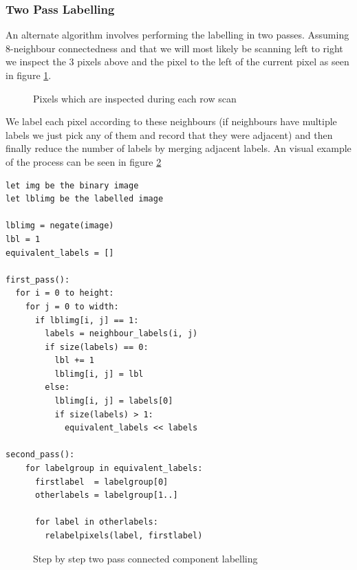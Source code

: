 \subsubsection{Two Pass Labelling}

An alternate algorithm involves performing the labelling in two passes. Assuming 8-neighbour connectedness and that we will most likely be scanning left to right we inspect the 3 pixels above and the pixel to the left of the current pixel as seen in figure \ref{fig:scan-neighbours}.

\begin{figure}[h!]
  \centering
  
  \caption{Pixels which are inspected during each row scan}
  \label{fig:scan-neighbours}
\end{figure}

We label each pixel according to these neighbours (if neighbours have multiple labels we just pick any of them and record that they were adjacent) and then finally reduce the number of labels by merging adjacent labels. An visual example of the process can be seen in figure \ref{fig:ccl-two-pass}

\begin{lstlisting}[caption=Iterative Two-Pass Connected Component Labelling, label=alg:ccl-iterative]
let img be the binary image
let lblimg be the labelled image

lblimg = negate(image)
lbl = 1
equivalent_labels = []

first_pass():
  for i = 0 to height:
    for j = 0 to width:
      if lblimg[i, j] == 1:
        labels = neighbour_labels(i, j)
        if size(labels) == 0:
          lbl += 1
          lblimg[i, j] = lbl
        else:
          lblimg[i, j] = labels[0]
          if size(labels) > 1:
            equivalent_labels << labels

second_pass():
    for labelgroup in equivalent_labels:
      firstlabel  = labelgroup[0]
      otherlabels = labelgroup[1..]

      for label in otherlabels:
        relabelpixels(label, firstlabel)
\end{lstlisting}

\begin{figure}[h!]
  \centering

  
  
  
  

  \caption{Step by step two pass connected component labelling}
  \label{fig:ccl-two-pass}
\end{figure}


